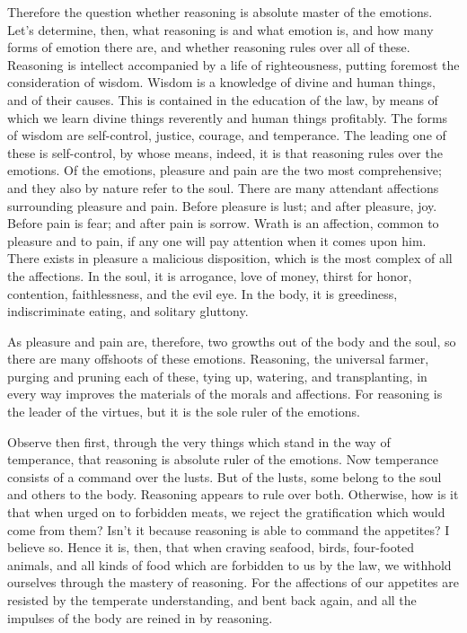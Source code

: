  Therefore the question whether reasoning is absolute
master of the emotions.  Let's determine, then, what
reasoning is and what emotion is, and how many forms of emotion there
are, and whether reasoning rules over all of these. 
Reasoning is intellect accompanied by a life of righteousness, putting
foremost the consideration of wisdom.  Wisdom is a
knowledge of divine and human things, and of their causes.
 This is contained in the education of the law, by means
of which we learn divine things reverently and human things profitably.
 The forms of wisdom are self-control, justice, courage,
and temperance.  The leading one of these is
self-control, by whose means, indeed, it is that reasoning rules over
the emotions.  Of the emotions, pleasure and pain are the
two most comprehensive; and they also by nature refer to the soul.
 There are many attendant affections surrounding pleasure
and pain.  Before pleasure is lust; and after pleasure,
joy.  Before pain is fear; and after pain is sorrow.
 Wrath is an affection, common to pleasure and to pain,
if any one will pay attention when it comes upon him. 
There exists in pleasure a malicious disposition, which is the most
complex of all the affections.  In the soul, it is
arrogance, love of money, thirst for honor, contention, faithlessness,
and the evil eye.  In the body, it is greediness,
indiscriminate eating, and solitary gluttony.

 As pleasure and pain are, therefore, two growths out of
the body and the soul, so there are many offshoots of these emotions.
 Reasoning, the universal farmer, purging and pruning
each of these, tying up, watering, and transplanting, in every way
improves the materials of the morals and affections.  For
reasoning is the leader of the virtues, but it is the sole ruler of the
emotions.

Observe then first, through the very things which stand in the way of
temperance, that reasoning is absolute ruler of the emotions.
 Now temperance consists of a command over the lusts.
 But of the lusts, some belong to the soul and others to
the body. Reasoning appears to rule over both. 
Otherwise, how is it that when urged on to forbidden meats, we reject
the gratification which would come from them? Isn't it because reasoning
is able to command the appetites? I believe so.  Hence it
is, then, that when craving seafood, birds, four-footed animals, and all
kinds of food which are forbidden to us by the law, we withhold
ourselves through the mastery of reasoning.  For the
affections of our appetites are resisted by the temperate understanding,
and bent back again, and all the impulses of the body are reined in by
reasoning.

